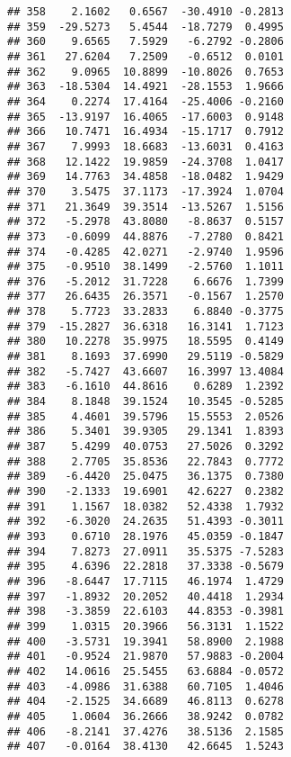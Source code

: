 \documentclass[
]{article}
\begin{document}
\begin{verbatim}
## 358    2.1602   0.6567  -30.4910 -0.2813
## 359  -29.5273   5.4544  -18.7279  0.4995
## 360    9.6565   7.5929   -6.2792 -0.2806
## 361   27.6204   7.2509   -0.6512  0.0101
## 362    9.0965  10.8899  -10.8026  0.7653
## 363  -18.5304  14.4921  -28.1553  1.9666
## 364    0.2274  17.4164  -25.4006 -0.2160
## 365  -13.9197  16.4065  -17.6003  0.9148
## 366   10.7471  16.4934  -15.1717  0.7912
## 367    7.9993  18.6683  -13.6031  0.4163
## 368   12.1422  19.9859  -24.3708  1.0417
## 369   14.7763  34.4858  -18.0482  1.9429
## 370    3.5475  37.1173  -17.3924  1.0704
## 371   21.3649  39.3514  -13.5267  1.5156
## 372   -5.2978  43.8080   -8.8637  0.5157
## 373   -0.6099  44.8876   -7.2780  0.8421
## 374   -0.4285  42.0271   -2.9740  1.9596
## 375   -0.9510  38.1499   -2.5760  1.1011
## 376   -5.2012  31.7228    6.6676  1.7399
## 377   26.6435  26.3571   -0.1567  1.2570
## 378    5.7723  33.2833    6.8840 -0.3775
## 379  -15.2827  36.6318   16.3141  1.7123
## 380   10.2278  35.9975   18.5595  0.4149
## 381    8.1693  37.6990   29.5119 -0.5829
## 382   -5.7427  43.6607   16.3997 13.4084
## 383   -6.1610  44.8616    0.6289  1.2392
## 384    8.1848  39.1524   10.3545 -0.5285
## 385    4.4601  39.5796   15.5553  2.0526
## 386    5.3401  39.9305   29.1341  1.8393
## 387    5.4299  40.0753   27.5026  0.3292
## 388    2.7705  35.8536   22.7843  0.7772
## 389   -6.4420  25.0475   36.1375  0.7380
## 390   -2.1333  19.6901   42.6227  0.2382
## 391    1.1567  18.0382   52.4338  1.7932
## 392   -6.3020  24.2635   51.4393 -0.3011
## 393    0.6710  28.1976   45.0359 -0.1847
## 394    7.8273  27.0911   35.5375 -7.5283
## 395    4.6396  22.2818   37.3338 -0.5679
## 396   -8.6447  17.7115   46.1974  1.4729
## 397   -1.8932  20.2052   40.4418  1.2934
## 398   -3.3859  22.6103   44.8353 -0.3981
## 399    1.0315  20.3966   56.3131  1.1522
## 400   -3.5731  19.3941   58.8900  2.1988
## 401   -0.9524  21.9870   57.9883 -0.2004
## 402   14.0616  25.5455   63.6884 -0.0572
## 403   -4.0986  31.6388   60.7105  1.4046
## 404   -2.1525  34.6689   46.8113  0.6278
## 405    1.0604  36.2666   38.9242  0.0782
## 406   -8.2141  37.4276   38.5136  2.1585
## 407   -0.0164  38.4130   42.6645  1.5243
\end{verbatim}
\end{document}
